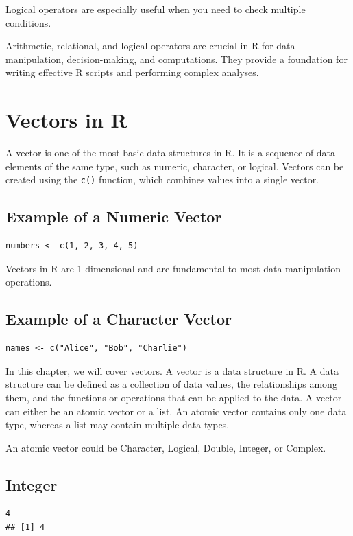 \documentclass[12pt]{book}
\begin{document}
Logical operators are especially useful when you need to check multiple conditions.


Arithmetic, relational, and logical operators are crucial in R for data manipulation, decision-making, and computations. They provide a foundation for writing effective R scripts and performing complex analyses.




\section{Vectors in R}
A vector is one of the most basic data structures in R. It is a sequence of data elements of the same type, such as numeric, character, or logical. Vectors can be created using the \texttt{c()} function, which combines values into a single vector.

\subsection{Example of a Numeric Vector}
\begin{verbatim}
numbers <- c(1, 2, 3, 4, 5)
\end{verbatim}
Vectors in R are 1-dimensional and are fundamental to most data manipulation operations.

\subsection{Example of a Character Vector}
\begin{verbatim}
names <- c("Alice", "Bob", "Charlie")
\end{verbatim}



In this chapter, we will cover vectors. A vector is a data structure in R. A data structure can be defined as a collection of data values, the relationships among them, and the functions or operations that can be applied to the data. A vector can either be an atomic vector or a list. An atomic vector contains only one data type, whereas a list may contain multiple data types.

An atomic vector could be Character, Logical, Double, Integer, or Complex.

\subsection{Integer}
\begin{verbatim}
4
## [1] 4
\end{verbatim}
\end{document}
